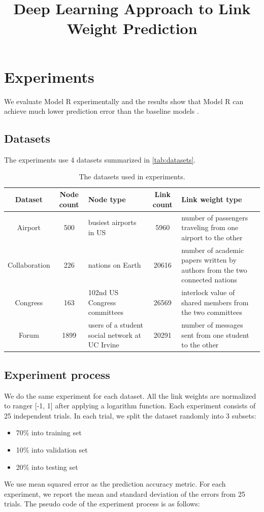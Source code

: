 \documentclass[letterpaper]{article}
\title{Deep Learning Approach to Link Weight Prediction}
\begin{document}
\maketitle


\section{Experiments}
We evaluate Model R experimentally
and the results show that 
Model R can achieve much lower prediction error than the baseline models \cite{aicher2014learning}.

\subsection{Datasets}
The experiments use 4 datasets summarized in \autoref{tab:datasets}.
\begin{table}[!htb]
	\centering
	\caption{The datasets used in experiments.}
	\begin{tabularx}{\textwidth}{|c|c|X|c|X|}  \hline \rowcolor{blue!50}
		Dataset & Node count & Node type & Link count & Link weight type \\ \hline
		Airport\cite{colizza2007reaction} & 500 & busiest airports in US & 5960 & number of passengers traveling from one airport to the other\\ \hline
		Collaboration\cite{pan2012world} & 226 & nations on Earth & 20616 & number of academic papers written by authors from the two connected nations \\ \hline
		Congress\cite{porter2005network} & 163  & 102nd US Congress committees & 26569 & interlock value of shared members from the two committees \\ \hline
		Forum\cite{opsahl2009clustering}  & 1899 & users of a student social network at UC Irvine & 20291 & number of messages sent from one student to the other \\ \hline
	\end{tabularx}
	\label{tab:datasets}
\end{table}

\subsection{Experiment process}
We do the same experiment for each dataset.
All the link weights are normalized to ranger [-1, 1] after applying a logarithm function.
Each experiment consists of 25 independent trials.
In each trial, we split the dataset randomly into 3 subsets:
\begin{itemize}
	\item 70\% into training set
	\item 10\% into validation set
	\item 20\% into testing set
\end{itemize}
We use mean squared error as the prediction accuracy metric.
For each experiment, we report the mean and standard deviation of the errors from 25 trials.
The pseudo code of the experiment process is as follows:
\end{document}
